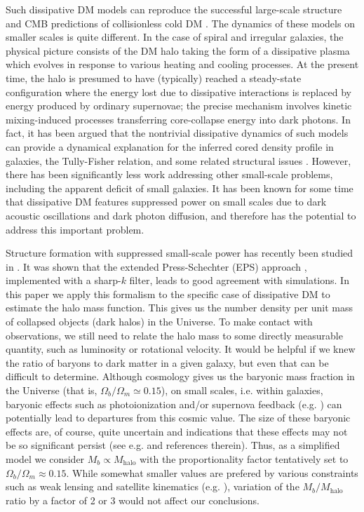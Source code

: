\documentclass[12pt]{article}
\begin{document}
Such dissipative DM models can reproduce the successful large-scale structure and CMB predictions of collisionless cold 
DM \cite{ber1,ignatiev,ber2,cmb2,cyr2,cyn}. The dynamics of these models on smaller scales is quite different. 
In the case of spiral and irregular galaxies, 
the physical picture consists of the DM halo taking the form of a dissipative plasma which evolves in response to various heating and cooling processes. At the present time, the halo is presumed to have (typically) reached a 
steady-state configuration where the energy lost due to dissipative interactions is replaced by energy produced by ordinary supernovae;
the precise mechanism involves kinetic mixing-induced processes transferring core-collapse energy into dark photons. 
In fact, it has been argued that the nontrivial dissipative dynamics of such models can 
provide a dynamical explanation for the inferred cored density profile in galaxies, the Tully-Fisher relation, 
and some related structural issues \cite{footexploredb,footexploredc,rich8,footexploredd,footexplorede}. 
However, there has been 
significantly less work addressing other small-scale problems,  including the apparent 
deficit of small galaxies. It has been known for some time that dissipative DM features suppressed power on small scales 
due to dark acoustic oscillations and dark photon diffusion, and therefore has the potential to address this important problem.

Structure formation with suppressed small-scale power has recently been studied in \cite{benson,s13,schneider}. 
It was shown that the extended Press-Schechter (EPS) approach \cite{ps,Bond}, implemented with a sharp-$k$ filter, leads to 
good agreement with simulations. In this paper we apply this formalism to the specific case of dissipative DM to estimate the halo mass function. 
This gives us the number density per unit mass of collapsed objects (dark halos) in the Universe. 
To make contact with observations, we still need to relate the halo mass to some directly measurable quantity, such as luminosity or 
rotational velocity. It would be helpful if we knew the ratio of baryons to dark matter in a given galaxy, but even 
that can be difficult to determine. Although cosmology gives 
us the baryonic mass fraction in the Universe (that is, $\Omega_{b}/\Omega_{m} \simeq 0.15$), on small scales, i.e.  within galaxies, 
baryonic effects such as photoionization and/or supernova feedback (e.g. \cite{bul9}) can potentially lead to departures from this 
cosmic value. The size of these baryonic effects are, of course, quite uncertain and 
indications that these effects may not be so significant persist 
(see e.g. \cite{zavala} and references therein). Thus, as a simplified model we consider
$M_b \propto M_{\text{halo}}$ with the proportionality factor tentatively set to $\Omega_{b}/\Omega_{m} \approx 0.15 $.
While somewhat smaller values are prefered by various constraints such as weak lensing and satellite kinematics (e.g. \cite{dutton,mand}),
variation of the $M_b/M_{\text{halo}}$ ratio by a factor of 2 or 3
would not affect our conclusions.
\end{document}
